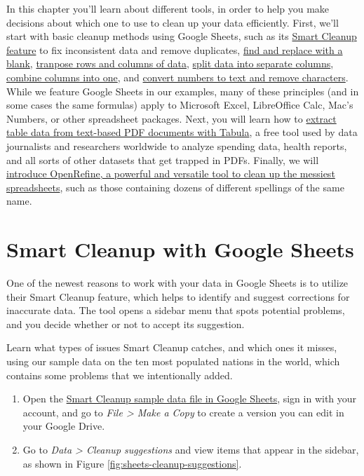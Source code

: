 \documentclass[
  english,
]{book}
\begin{document}
In this chapter you'll learn about different tools, in order to help you make decisions about which one to use to clean up your data efficiently. First, we'll start with basic cleanup methods using Google Sheets, such as its \href{smart-cleanup.html}{Smart Cleanup feature} to fix inconsistent data and remove duplicates, \href{find-and-replace.html}{find and replace with a blank}, \href{transpose.html}{tranpose rows and columns of data}, \href{split-data.html}{split data into separate columns}, \href{combine-data.html}{combine columns into one}, and \href{numbers-to-text.html}{convert numbers to text and remove characters}. While we feature Google Sheets in our examples, many of these principles (and in some cases the same formulas) apply to Microsoft Excel, LibreOffice Calc, Mac's Numbers, or other spreadsheet packages. Next, you will learn how to \href{tabula.html}{extract table data from text-based PDF documents with Tabula}, a free tool used by data journalists and researchers worldwide to analyze spending data, health reports, and all sorts of other datasets that get trapped in PDFs. Finally, we will \href{open-refine.html}{introduce OpenRefine, a powerful and versatile tool to clean up the messiest spreadsheets}, such as those containing dozens of different spellings of the same name.

\hypertarget{smart-cleanup}{%
\section*{Smart Cleanup with Google Sheets}\label{smart-cleanup}}

One of the newest reasons to work with your data in Google Sheets is to utilize their Smart Cleanup feature, which helps to identify and suggest corrections for inaccurate data. The tool opens a sidebar menu that spots potential problems, and you decide whether or not to accept its suggestion.

Learn what types of issues Smart Cleanup catches, and which ones it misses, using our sample data on the ten most populated nations in the world, which contains some problems that we intentionally added.

\begin{enumerate}
\def\labelenumi{\arabic{enumi}.}
\item
  Open the \href{https://docs.google.com/spreadsheets/d/1N06Xv87K9A-veKyQ2FPlT68fzbsN9q6lWv8hAb36K_E/edit\#gid=0}{Smart Cleanup sample data file in Google Sheets}, sign in with your account, and go to \emph{File \textgreater{} Make a Copy} to create a version you can edit in your Google Drive.
\item
  Go to \emph{Data \textgreater{} Cleanup suggestions} and view items that appear in the sidebar, as shown in Figure \ref{fig:sheets-cleanup-suggestions}.
\end{enumerate}
\end{document}
